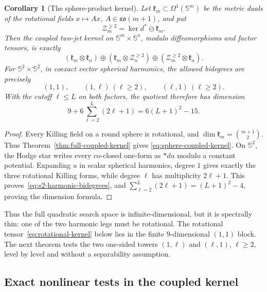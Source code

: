 \documentclass[11pt]{amsart}
\newtheorem{corollary}[theorem]{Corollary}
\theoremstyle{definition}
\theoremstyle{remark}
\newcommand{\Sph}{\mathbb S}
\begin{document}
\begin{corollary}[The sphere-product kernel]
\label{cor:sphere-coupled-kernel}
Let $\mathfrak k_m\subset\Omega^1(\Sph^m)$ be the metric duals of
the rotational fields $x\mapsto Ax$, $A\in\mathfrak{so}(m+1)$, and
put
\[
 \mathcal Z_m^{\geq2}=\ker d^*\ominus\mathfrak k_m.
\]
Then the coupled two-jet kernel on $\Sph^m\times\Sph^n$, modulo
diffeomorphisms and factor tensors, is exactly
\begin{equation}\label{eq:sphere-coupled-kernel}
 (\mathfrak k_m\otimes\mathfrak k_n)
 \oplus(\mathfrak k_m\otimes\mathcal Z_n^{\geq2})
 \oplus(\mathcal Z_m^{\geq2}\otimes\mathfrak k_n).
\end{equation}
For $\Sph^2\times\Sph^2$, in coexact vector spherical harmonics,
the allowed bidegrees are precisely
\begin{equation}\label{eq:s2-harmonic-bidegrees}
 (1,1),\qquad (1,\ell)\ (\ell\geq2),
 \qquad (\ell,1)\ (\ell\geq2).
\end{equation}
With the cutoff $\ell\leq L$ on both factors, the quotient therefore
has dimension
\begin{equation}\label{eq:s2-kernel-cutoff-dimension}
 9+6\sum_{\ell=2}^{L}(2\ell+1)
 =6(L+1)^2-15.
\end{equation}
\end{corollary}

\begin{proof}
Every Killing field on a round sphere is rotational, and
$\dim\mathfrak k_m=\binom{m+1}{2}$.  Thus
Theorem~\ref{thm:full-coupled-kernel} gives
\eqref{eq:sphere-coupled-kernel}.  On $\Sph^2$, the Hodge star writes
every co-closed one-form as $*du$ modulo a constant potential.  Expanding
$u$ in scalar spherical harmonics, degree $1$ gives exactly the three
rotational Killing forms, while degree $\ell$ has multiplicity
$2\ell+1$.  This proves~\eqref{eq:s2-harmonic-bidegrees}, and
$\sum_{\ell=2}^{L}(2\ell+1)=(L+1)^2-4$, proving the dimension formula.
\end{proof}

Thus the full quadratic search space is infinite-dimensional, but it
is spectrally thin: one of the two harmonic legs must be rotational.
The rotational tensor~\eqref{eq:rotational-kernel} below lies in the
finite $9$-dimensional $(1,1)$ block.  The next theorem tests the two
one-sided towers $(1,\ell)$ and $(\ell,1)$, $\ell\geq2$, level by
level and without a separability assumption.

\subsection{Exact nonlinear tests in the coupled kernel}
\end{document}
